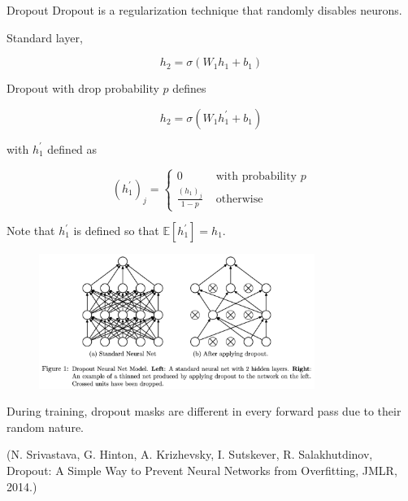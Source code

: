 \begin{frame}[allowframebreaks]

\begin{mydefinitionblock}{6.11}{Dropout}
    Dropout is a regularization technique that randomly disables neurons.

    Standard layer,

    $$
    h_{2}=\sigma\left(W_{1} h_{1}+b_{1}\right)
    $$

    Dropout with drop probability $p$ defines

    $$
    h_{2}=\sigma\left(W_{1} h_{1}^{\prime}+b_{1}\right)
    $$

    with $h_{1}^{\prime}$ defined as

    $$
    \left(h_{1}^{\prime}\right)_{j}= \begin{cases}0 & \text { with probability } p \\ \frac{\left(h_{1}\right)_{j}}{1-p} & \text { otherwise }\end{cases}
    $$

    Note that $h_{1}^{\prime}$ is defined so that $\mathbb{E}[h_{1}^{\prime}]=h_1$.

    \begin{figure}[H]
        \centering
        \includegraphics[width=0.8\textwidth]{.././assets/6.6.png}
    \end{figure}

    During training, dropout masks are different in every forward pass due to their random nature.

    (N. Srivastava, G. Hinton, A. Krizhevsky, I. Sutskever, R. Salakhutdinov, Dropout: A Simple Way to Prevent Neural Networks from Overfitting, JMLR, 2014.)
\end{mydefinitionblock}

\end{frame}

